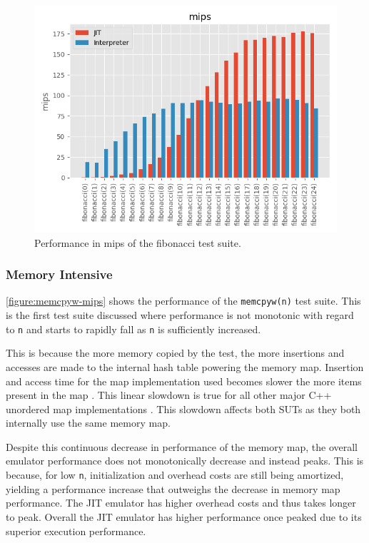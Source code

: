 \begin{figure}
    \centering
    \includegraphics{output/graphs/tests/fibonacci/mips.png}
    \caption{Performance in mips of the fibonacci test suite.}
    \label{figure:fibonacci-mips}
\end{figure}

\subsubsection{Memory Intensive}

\autoref{figure:memcpyw-mips} shows the performance of the \texttt{memcpyw(n)} test suite. This is the first test suite discussed where performance is not monotonic with regard to \texttt{n} and starts to rapidly fall as \texttt{n} is sufficiently increased.

This is because the more memory copied by the test, the more insertions and accesses are made to the internal hash table powering the memory map. Insertion and access time for the map implementation used becomes slower the more items present in the map \cite{tessil-benchmark}. This linear slowdown is true for all other major C++ unordered map implementations \cite{tessil-benchmark}. This slowdown affects both SUTs as they both internally use the same memory map.

Despite this continuous decrease in performance of the memory map, the overall emulator performance does not monotonically decrease and instead peaks. This is because, for low \texttt{n}, initialization and overhead costs are still being amortized, yielding a performance increase that outweighs the decrease in memory map performance. The JIT emulator has higher overhead costs and thus takes longer to peak. Overall the JIT emulator has higher performance once peaked due to its superior execution performance.

